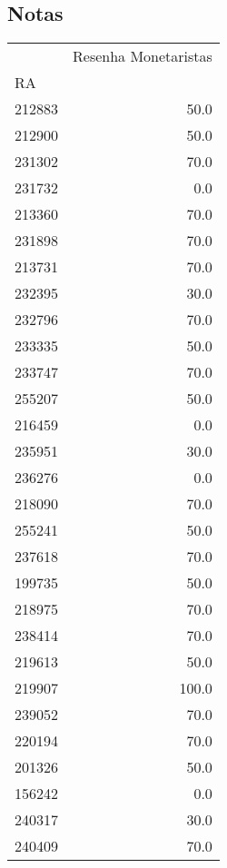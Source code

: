 \documentclass[11pt]{article}
\begin{document}
\subsection{Notas}
\label{sec:orgc3b3493}

\begin{tabular}{lr}
\toprule
{} &  Resenha Monetaristas \\
RA     &                       \\
\midrule
212883 &                  50.0 \\
212900 &                  50.0 \\
231302 &                  70.0 \\
231732 &                   0.0 \\
213360 &                  70.0 \\
231898 &                  70.0 \\
213731 &                  70.0 \\
232395 &                  30.0 \\
232796 &                  70.0 \\
233335 &                  50.0 \\
233747 &                  70.0 \\
255207 &                  50.0 \\
216459 &                   0.0 \\
235951 &                  30.0 \\
236276 &                   0.0 \\
218090 &                  70.0 \\
255241 &                  50.0 \\
237618 &                  70.0 \\
199735 &                  50.0 \\
218975 &                  70.0 \\
238414 &                  70.0 \\
219613 &                  50.0 \\
219907 &                 100.0 \\
239052 &                  70.0 \\
220194 &                  70.0 \\
201326 &                  50.0 \\
156242 &                   0.0 \\
240317 &                  30.0 \\
240409 &                  70.0 \\

\end{tabular}
\end{document}
